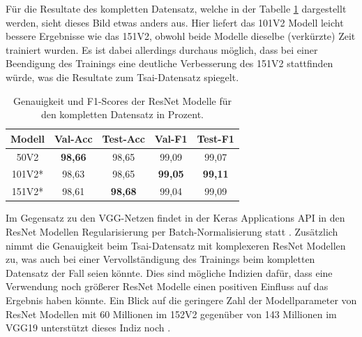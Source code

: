 \documentclass[twoside,a4paper]{IEEEtran}
\begin{document}
Für die Resultate des kompletten Datensatz, welche in der Tabelle \ref{resnet_ergebnis_full} dargestellt werden, sieht dieses Bild etwas anders aus. Hier liefert das 101V2 Modell leicht bessere Ergebnisse wie das 151V2, obwohl beide Modelle dieselbe (verkürzte) Zeit trainiert wurden. Es ist dabei allerdings durchaus möglich, dass bei einer Beendigung des Trainings eine deutliche Verbesserung des 151V2 stattfinden würde, was die Resultate zum Tsai-Datensatz spiegelt.
\begin{table}[!htb]
	\caption{Genauigkeit und F1-Scores der ResNet Modelle für den kompletten Datensatz in Prozent.}
	\label{resnet_ergebnis_full}
	\centering
	\begin{tabular}{|c|c|c|c|c|}
		\hline
		Modell & Val-Acc & Test-Acc & Val-F1 & Test-F1\\
		\hline
		\hline 
		50V2 & \textbf{98,66} & 98,65 & 99,09 & 99,07\\
		\hline
		101V2* & 98,63 & 98,65 & \textbf{99,05} & \textbf{99,11}\\
		\hline
		151V2* & 98,61 & \textbf{98,68} & 99,04 & 99,09\\
		\hline 
	\end{tabular}
\end{table}

Im Gegensatz zu den VGG-Netzen findet in der Keras Applications API in den ResNet Modellen Regularisierung per Batch-Normalisierung statt \cite{resnet_keras}. Zusätzlich nimmt die Genauigkeit beim Tsai-Datensatz mit komplexeren ResNet Modellen zu, was auch bei einer Vervollständigung des Trainings beim kompletten Datensatz der Fall seien könnte. Dies sind mögliche Indizien dafür, dass eine Verwendung noch größerer ResNet Modelle einen positiven Einfluss auf das Ergebnis haben könnte. Ein Blick auf die geringere Zahl der Modellparameter von ResNet Modellen mit 60 Millionen im 152V2 gegenüber von 143 Millionen im VGG19 unterstützt dieses Indiz noch \cite{keras_app}.
\end{document}
